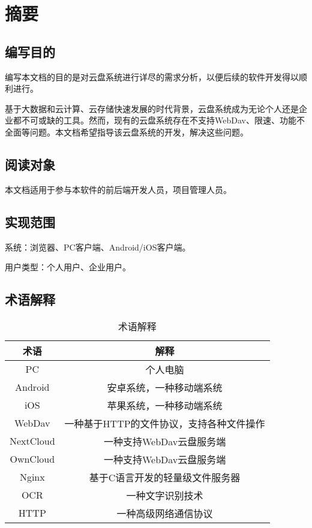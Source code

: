 \section{摘要}

\subsection{编写目的}

编写本文档的目的是对云盘系统进行详尽的需求分析，以便后续的软件开发得以顺利进行。

基于大数据和云计算、云存储快速发展的时代背景，云盘系统成为无论个人还是企业都不可或缺的工具。然而，现有的云盘系统存在不支持WebDav、限速、功能不全面等问题。本文档希望指导该云盘系统的开发，解决这些问题。

\subsection{阅读对象}

本文档适用于参与本软件的前后端开发人员，项目管理人员。

\subsection{实现范围}

系统：浏览器、PC客户端、Android/iOS客户端。

用户类型：个人用户、企业用户。

\subsection{术语解释}

\begin{table}[h]
    \begin{center}
        \caption{术语解释}
        \begin{tabular}{|c|c|}
            \hline
            术语 & 解释 \\
            \hline
            PC & 个人电脑 \\
            Android & 安卓系统，一种移动端系统 \\
            iOS & 苹果系统，一种移动端系统 \\
            WebDav & 一种基于HTTP的文件协议，支持各种文件操作 \\
            NextCloud & 一种支持WebDav云盘服务端 \\
            OwnCloud & 一种支持WebDav云盘服务端 \\
            Nginx & 基于C语言开发的轻量级文件服务器 \\
            OCR & 一种文字识别技术 \\
            HTTP & 一种高级网络通信协议 \\
            \hline
        \end{tabular}
    \end{center}
\end{table}
